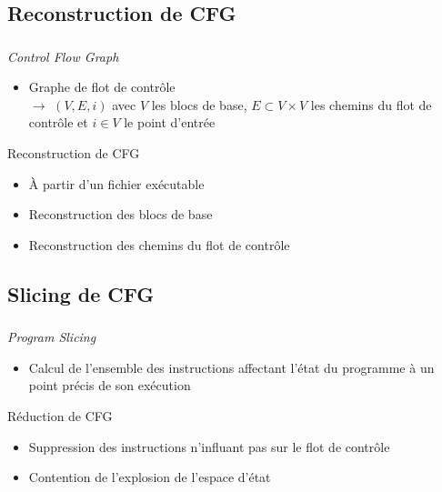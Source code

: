 \documentclass{beamer}
\begin{document}
    \subsection{Reconstruction de CFG}
    \begin{frame}\small
      \frametitle{\secname}
      \framesubtitle{\subsecname}

      \begin{block}{\textit{Control Flow Graph}}
        \begin{itemize}
          \item \og Graphe de flot de contrôle \fg \\
            $\rightarrow$ $(V,E,i)$ avec $V$ les blocs de base, $E \subset V \times V$
            les chemins du flot de contrôle et $i \in V$ le point d'entrée
        \end{itemize}
      \end{block}

      \pause
      \begin{block}{Reconstruction de CFG}
        \begin{itemize}
          \item À partir d'un fichier exécutable
          \item Reconstruction des blocs de base
          \item Reconstruction des chemins du flot de contrôle
        \end{itemize}
      \end{block}
    \end{frame}

    \subsection{Slicing de CFG}
    \begin{frame}\small
      \frametitle{\secname}
      \framesubtitle{\subsecname}
      
      \begin{block}{\textit{Program Slicing}}
        \begin{itemize}
          \item Calcul de l'ensemble des instructions affectant l'état du
            programme à un point précis de son exécution
        \end{itemize}
      \end{block}

      \pause
      \begin{block}{Réduction de CFG}
        \begin{itemize}
        \item Suppression des instructions n'influant pas sur le flot de contrôle
        \item Contention de l'explosion de l'espace d'état
        \end{itemize}
      \end{block}
    \end{frame}
\end{document}
